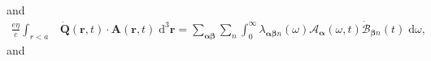 \documentclass{article}
\begin{document}
and
\begin{equation}
\begin{split}
\frac{e\eta}{c}\int_{r<a}&\dot{\mathbf{Q}}(\mathbf{r},t)\cdot\mathbf{A}(\mathbf{r},t)\;\mathrm{d}^3\mathbf{r}
= \sum_{\bm{\alpha}\bm{\beta}}\sum_n\int_0^\infty\lambda_{\bm{\alpha}\bm{\beta}n}(\omega)\mathcal{A}_{\bm{\alpha}}(\omega,t)\dot{\mathcal{B}}_{\bm{\beta}n}(t)\;\mathrm{d}\omega,
\end{split}
\end{equation}
and
\end{document}
